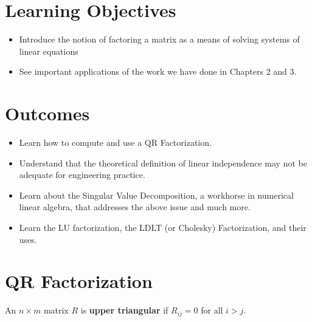 \section*{Learning Objectives}

\begin{itemize}
\item Introduce the notion of factoring a matrix as a means of solving systems of linear equations
\item See important applications of the work we have done in Chapters 2 and 3.
\end{itemize}

\section*{Outcomes} 
\begin{itemize}
\item  Learn how to compute and use a QR Factorization.
\item Understand that the theoretical definition of linear independence may not be adequate for engineering practice. 
\item Learn about the Singular Value Decomposition, a workhorse in numerical linear algebra, that addresses the above issue and much more. 
\item Learn the LU factorization, the LDLT (or Cholesky) Factorization, and their uses.
\end{itemize}

\newpage

\section{QR Factorization}

\begin{definition}
An $n \times m$ matrix $R$ is \textbf{upper triangular} if $R_{ij}=0$ for all $i>j$.
\end{definition}

